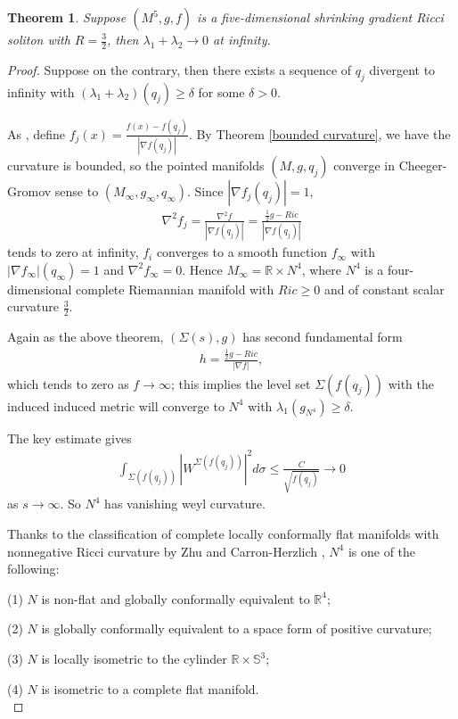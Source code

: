 \documentclass[12pt]{amsart}
\newcommand{\ban}{\begin{eqnarray*}}
\newcommand{\ean}{\end{eqnarray*}}
\newtheorem{theo}{Theorem}[section]
\begin{document}
\begin{theo}
	Suppose $(M^5, g, f)$ is a five-dimensional shrinking gradient Ricci soliton with $R=\frac{3}{2}$, then $\lambda_1+\lambda_2\rightarrow 0$ at infinity.
\end{theo}

\begin{proof}
	Suppose on the contrary, then there exists a sequence of $q_j$ divergent to infinity with $(\lambda_1+\lambda_2)(q_j)\geq \delta$ for some $\delta>0$.
	
	\smallskip
	As \cite{Naber}, define $f_j(x)=\frac{f(x)-f(q_j)}{|\nabla f(q_j)|}$. By Theorem \ref{bounded curvature}, we have the curvature is bounded, so the pointed manifolds $(M, g, q_j)$ converge in Cheeger-Gromov sense to $(M_\infty, g_\infty, q_\infty)$. Since  $|\nabla f_j(q_j)|=1$,
	\ban
	\nabla^2 f_j=\frac{\nabla^2 f}{|\nabla f(q_j)|}=\frac{\frac{1}{2}g-Ric}{|\nabla f(q_j)|}
	\ean
	tends to zero at infinity,  $f_i$ converges to a smooth function $f_\infty$ with $|\nabla f_\infty|(q_\infty)=1$ and $\nabla^2 f_\infty =0$. Hence $M_\infty=\mathbb{R}\times N^4$, where $N^4$ is a four-dimensional complete Riemannian manifold with $Ric\geq 0$ and of constant scalar curvature $\frac{3}{2}$.
	
	\smallskip
	Again as the above theorem,  $(\Sigma(s), g)$ has second fundamental form
	\ban
	h=\frac{\frac{1}{2}g-Ric}{|\nabla f|},
	\ean
	which tends to zero as $f\rightarrow \infty$;
	this implies the level set $\Sigma(f(q_j))$  with the induced induced metric will converge to $N^4$ with $\lambda_1(g_{N^4})\geq \delta$.
	
	\smallskip
	The key estimate gives
	\ban
	\int_{\Sigma(f(q_j))}|W^{\Sigma(f(q_j))}|^2d\sigma\leq \frac{C}{\sqrt{f(q_j)}}\rightarrow 0
	\ean
	as $s\rightarrow\infty$.
	So $N^4$ has vanishing weyl curvature.
	
	\smallskip
	Thanks to the classification of complete locally conformally flat manifolds
	with nonnegative Ricci curvature by Zhu \cite{Zhu} and Carron-Herzlich \cite{Carron-Herzlic}, $N^4$ is
	one of the following:
	
	\smallskip
	(1) $N$ is non-flat and globally conformally equivalent to $\mathbb{R}^4$;
	
	\smallskip
	(2)  $N$ is globally conformally equivalent to a space form of positive curvature;
	
	\smallskip
	(3)  $N$ is locally isometric to the cylinder $\mathbb{R}\times \mathbb{S}^3$;
	
	\smallskip
	(4)   $N$ is isometric to a complete flat manifold.\\
	

\end{proof}
\end{document}
